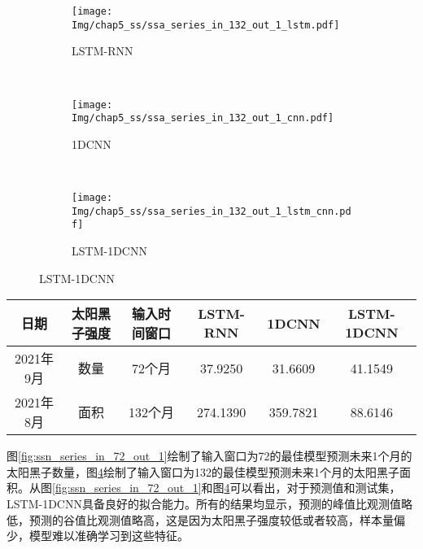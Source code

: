 \begin{figure}[!htbp]
  \centering
  \begin{subfigure}[b]{1.0\textwidth}
    \caption{LSTM-RNN} 
    \vspace{-0.35cm}
    \texttt{[image: Img/chap5\_ss/ssa\_series\_in\_132\_out\_1\_lstm.pdf]}
    \label{fig:ssa_series_in_132_out_1_lstm}
  \end{subfigure}    \\
  \vspace{-1cm}
  \begin{subfigure}[b]{1.0\textwidth}
    \caption{1DCNN}
    \vspace{-0.35cm}
    \texttt{[image: Img/chap5\_ss/ssa\_series\_in\_132\_out\_1\_cnn.pdf]}
    \label{fig:ssa_series_in_132_out_1_cnn}
  \end{subfigure} \\
  \vspace{-1cm}
  \begin{subfigure}[b]{1.0\textwidth}
    \caption{LSTM-1DCNN}
    \vspace{-0.35cm}
    \texttt{[image: Img/chap5\_ss/ssa\_series\_in\_132\_out\_1\_lstm\_cnn.pdf]}
    \label{fig:ssa_series_in_132_out_1_lstm_cnn}
    \end{subfigure}
  \vspace{-2cm}
  \label{fig:ssa_series_in_132_out_1}
\end{figure}

\begin{table}[!htbp]
\centering
{}
\label{tab:ss_out_1}
\footnotesize
\begin{tabular}{cccccc}
    \toprule
    日期 & 太阳黑子强度 & 输入时间窗口 & LSTM-RNN & 1DCNN & LSTM-1DCNN  \\
    \midrule
    2021年9月 & 数量 & 72个月 & 37.9250 & 31.6609 & 41.1549 \\
    2021年8月 & 面积 & 132个月 & 274.1390 & 359.7821 & 88.6146 \\
    \bottomrule
\end{tabular}
\end{table}

图\ref{fig:ssn_series_in_72_out_1}绘制了输入窗口为72的最佳模型预测未来1个月的太阳黑子数量，图\ref{fig:ssa_series_in_132_out_1}绘制了输入窗口为132的最佳模型预测未来1个月的太阳黑子面积。从图\ref{fig:ssn_series_in_72_out_1}和图\ref{fig:ssa_series_in_132_out_1}可以看出，对于预测值和测试集，LSTM-1DCNN具备良好的拟合能力。所有的结果均显示，预测的峰值比观测值略低，预测的谷值比观测值略高，这是因为太阳黑子强度较低或者较高，样本量偏少，模型难以准确学习到这些特征。


